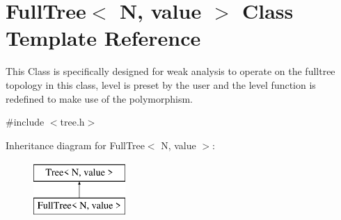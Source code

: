\hypertarget{classFullTree}{}\section{Full\+Tree$<$ N, value $>$ Class Template Reference}
\label{classFullTree}


This Class is specifically designed for weak analysis to operate on the fulltree topology in this class, level is preset by the user and the level function is redefined to make use of the polymorphism.  




{\ttfamily \#include $<$tree.\+h$>$}

Inheritance diagram for Full\+Tree$<$ N, value $>$\+:\begin{figure}[H]
\begin{center}
\leavevmode
\includegraphics[height=2.000000cm]{classFullTree}
\end{center}
\end{figure}
